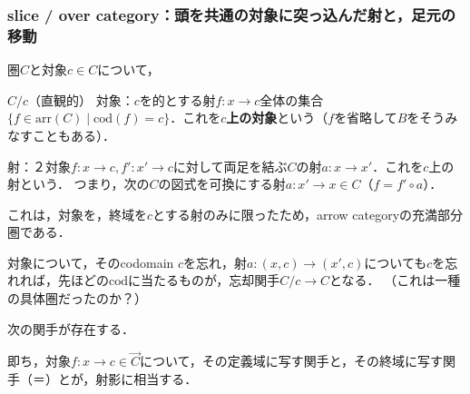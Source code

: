 \documentclass[uplatex, 12pt, dvipdfmx]{jsarticle}
\begin{document}
\subsubsection{slice / over category：頭を共通の対象に突っ込んだ射と，足元の移動}

圏$C$と対象$c\in C$について，
\begin{itembox}[l]{$C/c$（直観的）}
    対象：$c$を的とする射$f:x\to c$全体の集合$\{ f\in\mathrm{arr}(C)\mid \mathrm{cod}(f)=c \}$．これを\textbf{$c$上の対象}という（$f$を省略して$B$をそうみなすこともある）．
    
    射：２対象$f:x\to c, f':x'\to c$に対して両足を結ぶ$C$の射$a:x\to x'$．これを$c$上の射という．
    つまり，次の$C$の図式を可換にする射$a:x'\to x\in C$（$f=f'\circ a$）．
    \begin{center}\end{center}
\end{itembox}
\begin{proposition*}
    これは，対象を，終域を$c$とする射のみに限ったため，arrow categoryの充満部分圏である．
\end{proposition*}

対象について，そのcodomain $c$を忘れ，射$a:(x,c)\to (x',c)$についても$c$を忘れれば，先ほどの$\mathrm{cod}$に当たるものが，忘却関手$C/c\to C$となる．
（これは一種の具体圏だったのか？）
\begin{proposition*}
    次の関手が存在する．
\begin{center}\end{center}
    即ち，対象$f:x\to c\in\overrightarrow{C}$について，その定義域に写す関手と，その終域に写す関手（＝）とが，射影に相当する．
\end{proposition*}
\end{document}
